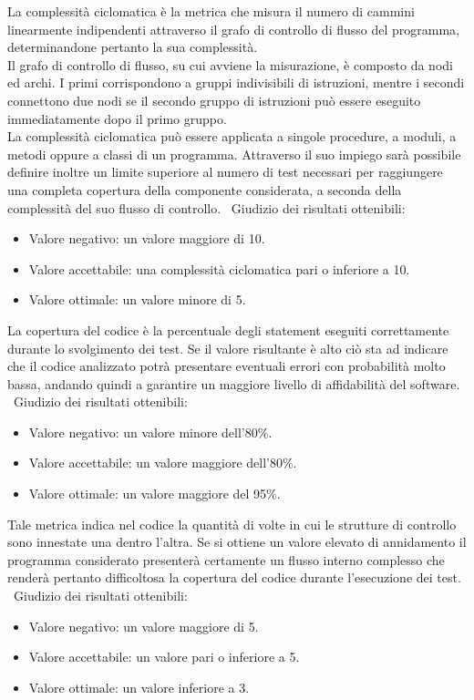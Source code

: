 \documentclass[a4paper, titlepage]{article}
\begin{document}
La complessità ciclomatica è la metrica che misura il numero di cammini linearmente indipendenti attraverso il grafo di controllo di flusso del programma, determinandone pertanto la sua complessità.
\\Il grafo di controllo di flusso, su cui avviene la misurazione, è composto da nodi ed archi. I primi corrispondono a gruppi indivisibili di istruzioni, mentre i secondi connettono due nodi se il secondo gruppo di istruzioni può essere eseguito immediatamente dopo il primo gruppo.
\\La complessità ciclomatica può essere
applicata a singole procedure, a moduli, a metodi oppure a classi di un programma.
Attraverso il suo impiego sarà possibile definire inoltre un limite superiore al numero di test necessari per raggiungere una completa copertura della componente considerata, a seconda della complessità del suo flusso di controllo.
\
\newline Giudizio dei risultati ottenibili:
\begin{itemize}
\item Valore negativo: un valore maggiore di 10. 
\item Valore accettabile: una complessità ciclomatica pari o inferiore a 10.
\item Valore ottimale: un valore minore di 5.
\end{itemize}

La copertura del codice è la percentuale degli statement eseguiti correttamente durante lo
svolgimento dei test. Se il valore risultante è alto ciò sta ad indicare che il codice analizzato potrà presentare eventuali errori con probabilità molto bassa, andando quindi a garantire un maggiore livello di affidabilità del software.
\
\newline Giudizio dei risultati ottenibili:
\begin{itemize}
\item Valore negativo: un valore minore dell'80\%. 
\item Valore accettabile: un valore maggiore dell'80\%.
\item Valore ottimale: un valore maggiore del 95\%.
\end{itemize}

Tale metrica indica nel codice la quantità di volte in cui le strutture di controllo sono innestate una dentro l’altra. Se si ottiene un valore elevato di annidamento il programma considerato presenterà certamente un flusso interno complesso che renderà pertanto difficoltosa la copertura del codice durante l'esecuzione dei test. 
\
\newline Giudizio dei risultati ottenibili:
\begin{itemize}
\item Valore negativo: un valore maggiore di 5.  
\item Valore accettabile: un valore pari o inferiore a 5.
\item Valore ottimale: un valore inferiore a 3.
\end{itemize}
\end{document}
